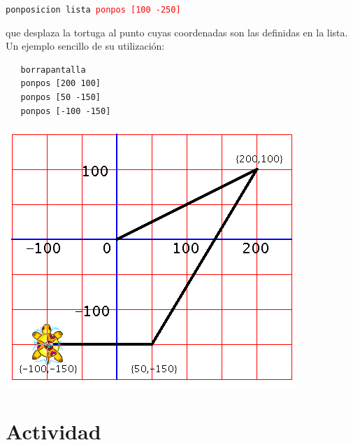 \documentclass[12pt,twoside,spanish,a4paper]{report}
\begin{document}
\texttt{ponposicion lista \hspace{2cm} \textcolor{red}{ponpos [100 -250]}}

\noindent que desplaza la tortuga al punto cuyas coordenadas son las definidas
en la lista. \\

\noindent Un ejemplo sencillo de su utilizaci\'on:
\begin{verbatim}
   borrapantalla
   ponpos [200 100]
   ponpos [50 -150]
   ponpos [-100 -150] \end{verbatim}
\begin{center}
   \includegraphics[scale=0.5]{Imagenes_Tutorial/05_Coordenadas.png}
\end{center} %

\section{Actividad}
   \label{sub:Actividad-Policubos}
\end{document}
